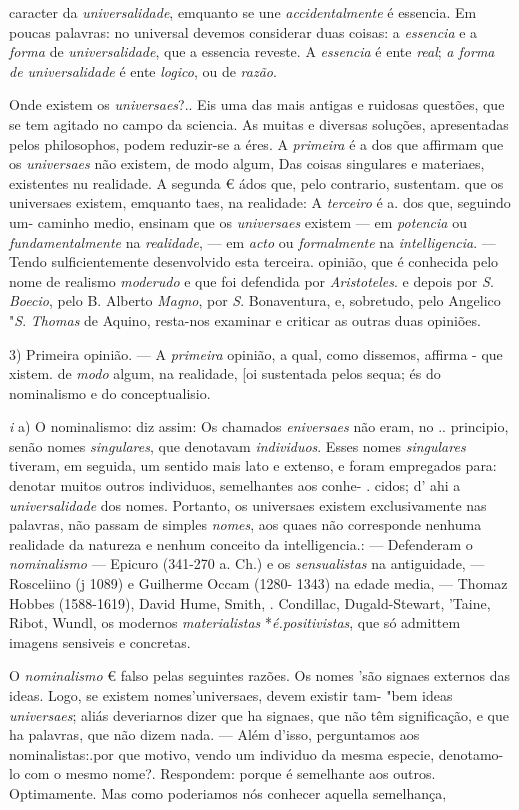 caracter da \emph{universalidade}, emquanto se une \emph{accidentalmente} é essencia. Em poucas palavras: no universal devemos considerar duas coisas: a \emph{essencia} e a \emph{forma} de \emph{universalidade}, que a essencia reveste. A \emph{essencia} é ente \emph{real}; \emph{a forma de universalidade} é ente \emph{logico}, ou de \emph{razão}.\par Onde existem os \emph{universaes}?.. Eis uma das mais antigas e ruidosas questões, que se tem agitado no campo da sciencia. As muitas e diversas soluções, apresentadas pelos philosophos, podem reduzir-se a éres. A \emph{primeira} é a dos que affirmam que os \emph{universaes} não existem, de modo algum, Das coisas singulares e materiaes, existentes nu realidade. A segunda € ádos que, pelo contrario, sustentam. que os universaes existem, emquanto taes, na realidade: A \emph{terceiro} é a. dos que, seguindo um- caminho medio, ensinam que os \emph{universaes} existem --- em \emph{potencia} ou \emph{fundamentalmente} na \emph{realidade}, --- em \emph{acto} ou \emph{formalmente} na \emph{intelligencia}. --- Tendo sulficientemente desenvolvido esta terceira. opinião, que é conhecida pelo nome de realismo \emph{moderudo} e que foi defendida por \emph{Aristoteles}. e depois por \emph{S}. \emph{Boecio}, pelo B. Alberto \emph{Magno}, por \emph{S}. Bonaventura, e, sobretudo, pelo Angelico "\emph{S}. \emph{Thomas} de Aquino, resta-nos examinar e criticar as outras duas opiniões.\par 3) Primeira opinião. --- A \emph{primeira} opinião, a qual, como dissemos, affirma - que xistem. de \emph{modo} algum, na realidade, [oi sustentada pelos sequa; és do nominalismo e do conceptualisio.\par \emph{i} a) O nominalismo: diz assim: Os chamados \emph{eniversaes} não eram, no .. principio, senão nomes \emph{singulares}, que denotavam \emph{individuos}. Esses nomes \emph{singulares} tiveram, em seguida, um sentido mais lato e extenso, e foram empregados para: denotar muitos outros individuos, semelhantes aos conhe- . cidos; d' ahi a \emph{universalidade} dos nomes. Portanto, os universaes existem exclusivamente nas palavras, não passam de simples \emph{nomes}, aos quaes não corresponde nenhuma realidade da natureza e nenhum conceito da intelligencia.: --- Defenderam o \emph{nominalismo} --- Epicuro (341-270 a. Ch.) e os \emph{sensualistas} na antiguidade, --- Rosceliino (j 1089) e Guilherme Occam (1280- 1343) na edade media, --- Thomaz Hobbes (1588-1619), David Hume, Smith, . Condillac, Dugald-Stewart, 'Taine, Ribot, Wundl, os modernos \emph{materialistas} *\emph{é.positivistas}, que só admittem imagens sensiveis e concretas.\par O \emph{nominalismo} € falso pelas seguintes razões. Os nomes 'são signaes externos das ideas. Logo, se existem nomes'universaes, devem existir tam- "bem ideas \emph{universaes}; aliás deveriarnos dizer que ha signaes, que não têm significação, e que ha palavras, que não dizem nada. --- Além d'isso, perguntamos aos nominalistas:.por que motivo, vendo um individuo da mesma especie, denotamo-lo com o mesmo nome?. Respondem: porque é semelhante aos outros. Optimamente. Mas como poderiamos nós conhecer aquella semelhança, 